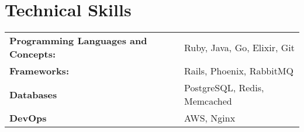 \documentclass[a4,10pt]{article}
\newenvironment{zitemize}{
\begin{itemize}\itemsep0pt \parskip0pt \parsep1pt}
{\end{itemize}\vspace{-0.5cm}}
\newcommand{\hskills}[1]{
\textbf{\bfseries #1} }
\begin{document}
\section{Technical Skills}
\begin{tabular}{p{20em} p{1em} p{43em}}
\hskills{Programming Languages and Concepts:}&  &  Ruby, Java, Go, Elixir, Git \\
\hskills{Frameworks:} &  & Rails, Phoenix, RabbitMQ  \\
\hskills{Databases} &  & PostgreSQL, Redis, Memcached \\
\hskills{DevOps} &  & AWS, Nginx \\
\end{tabular}
\vspace{-0.2cm}







\end{document}
